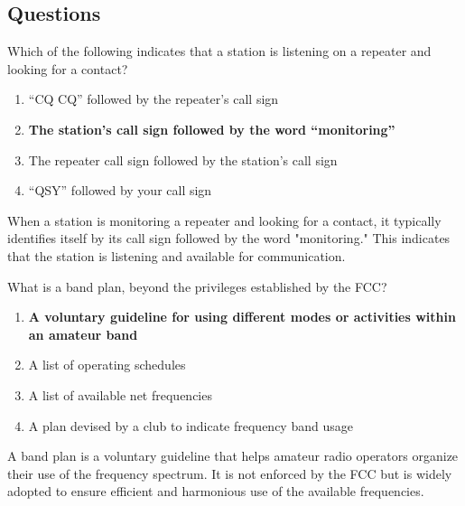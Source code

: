 \subsection*{Questions}
\begin{tcolorbox}[colback=gray!10!white,colframe=black!75!black,title={T2A09}]
    Which of the following indicates that a station is listening on a repeater and looking for a contact?
    \begin{enumerate}[label=\Alph*),noitemsep]
        \item “CQ CQ” followed by the repeater’s call sign
        \item \textbf{The station’s call sign followed by the word “monitoring”}
        \item The repeater call sign followed by the station’s call sign
        \item “QSY” followed by your call sign
    \end{enumerate}
\end{tcolorbox}
When a station is monitoring a repeater and looking for a contact, it typically identifies itself by its call sign followed by the word "monitoring." This indicates that the station is listening and available for communication.


\begin{tcolorbox}[colback=gray!10!white,colframe=black!75!black,title={T2A10}]
    What is a band plan, beyond the privileges established by the FCC?
    \begin{enumerate}[label=\Alph*),noitemsep]
        \item \textbf{A voluntary guideline for using different modes or activities within an amateur band}
        \item A list of operating schedules
        \item A list of available net frequencies
        \item A plan devised by a club to indicate frequency band usage
    \end{enumerate}
\end{tcolorbox}
A band plan is a voluntary guideline that helps amateur radio operators organize their use of the frequency spectrum. It is not enforced by the FCC but is widely adopted to ensure efficient and harmonious use of the available frequencies.



